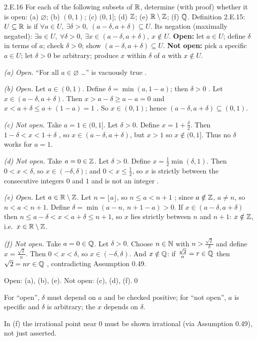 \begin{bookex}[recommended]{2.E.16}
For each of the following subsets of $\mathbb{R}$, determine (with proof) whether it is open: (a) $\varnothing$; (b) $(0,1)$; (c) $(0,1]$; (d) $\mathbb{Z}$; (e) $\mathbb{R}\setminus\mathbb{Z}$; (f) $\mathbb{Q}$.
\solution
\given Definition 2.E.15: $U\subseteq\mathbb{R}$ is  if $\forall a\in U,\ \exists\delta>0,\ (a-\delta,a+\delta)\subseteq U$. Its negation (maximally negated): $\exists a\in U,\ \forall\delta>0,\ \exists x\in(a-\delta,a+\delta),\ x\notin U$.
\plan \textbf{Open:} let $a\in U$; define $\delta$ in terms of $a$; check $\delta>0$; show $(a-\delta,a+\delta)\subseteq U$. \textbf{Not open:} pick a specific $a\in U$; let $\delta>0$ be arbitrary; produce $x$ within $\delta$ of $a$ with $x\notin U$.
\begin{steps}
\item \emph{(a) Open.} ``For all $a\in\varnothing$ \dots'' is vacuously true .
\item \emph{(b) Open.} Let $a\in(0,1)$. Define $\delta=\min(a,1-a)$; then $\delta>0$ . Let $x\in(a-\delta,a+\delta)$. Then $x>a-\delta\ge a-a=0$  and $x<a+\delta\le a+(1-a)=1$ . So $x\in(0,1)$; hence $(a-\delta,a+\delta)\subseteq(0,1)$.
\item \emph{(c) Not open.} Take $a=1\in(0,1]$. Let $\delta>0$. Define $x=1+\frac\delta2$. Then $1-\delta<x<1+\delta$ , so $x\in(a-\delta,a+\delta)$, but $x>1$ so $x\notin(0,1]$. Thus no $\delta$ works for $a=1$.
\item \emph{(d) Not open.} Take $a=0\in\mathbb{Z}$. Let $\delta>0$. Define $x=\frac12\min(\delta,1)$. Then $0<x<\delta$, so $x\in(-\delta,\delta)$; and $0<x\le\frac12$, so $x$ is strictly between the consecutive integers $0$ and $1$ and is not an integer .
\item \emph{(e) Open.} Let $a\in\mathbb{R}\setminus\mathbb{Z}$. Let $n=\lfloor a\rfloor$, so $n\le a<n+1$ ; since $a\notin\mathbb{Z}$, $a\ne n$, so $n<a<n+1$. Define $\delta=\min(a-n,\ n+1-a)>0$. If $x\in(a-\delta,a+\delta)$ then $n\le a-\delta<x<a+\delta\le n+1$, so $x$ lies strictly between $n$ and $n+1$: $x\notin\mathbb{Z}$, i.e.\ $x\in\mathbb{R}\setminus\mathbb{Z}$.
\item \emph{(f) Not open.} Take $a=0\in\mathbb{Q}$. Let $\delta>0$. Choose $n\in\mathbb{N}$ with $n>\frac{\sqrt2}\delta$  and define $x=\frac{\sqrt2}n$. Then $0<x<\delta$, so $x\in(-\delta,\delta)$. And $x\notin\mathbb{Q}$: if $\frac{\sqrt2}n=r\in\mathbb{Q}$ then $\sqrt2=nr\in\mathbb{Q}$ , contradicting Assumption 0.49.
\end{steps}
\conclusion Open: (a), (b), (e). Not open: (c), (d), (f).\qed
\begin{compare}
\item For ``open'', $\delta$ must depend on $a$ and be checked positive; for ``not open'', $a$ is specific and $\delta$ is arbitrary; the $x$ depends on $\delta$.
\item In (f) the irrational point near $0$ must be shown irrational (via Assumption 0.49), not just asserted.
\end{compare}
\end{bookex}

